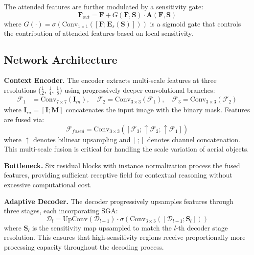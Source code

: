 \documentclass[preprint,12pt]{elsarticle}
\begin{document}
The attended features are further modulated by a sensitivity gate:
\begin{equation}
\mathbf{F}_{out} = \mathbf{F} + G(\mathbf{F}, \mathbf{S}) \cdot \mathbf{A}(\mathbf{F}, \mathbf{S})
\label{eq:gate}
\end{equation}
where $G(\cdot) = \sigma(\text{Conv}_{1\times1}([\mathbf{F}; \mathbf{E}_s(\mathbf{S})]))$ is a sigmoid gate that controls the contribution of attended features based on local sensitivity.

\subsection{Network Architecture}

\textbf{Context Encoder.} The encoder extracts multi-scale features at three resolutions ($\frac{1}{2}$, $\frac{1}{4}$, $\frac{1}{8}$) using progressively deeper convolutional branches:
\begin{align}
\mathcal{F}_1 &= \text{Conv}_{7\times7}(\mathbf{I}_{in}), \quad \mathcal{F}_2 = \text{Conv}_{3\times3}(\mathcal{F}_1), \quad \mathcal{F}_3 = \text{Conv}_{3\times3}(\mathcal{F}_2)
\end{align}
where $\mathbf{I}_{in} = [\mathbf{I}; \mathbf{M}]$ concatenates the input image with the binary mask. Features are fused via:
\begin{equation}
\mathcal{F}_{fused} = \text{Conv}_{3\times3}\left(\left[\mathcal{F}_3; \uparrow\mathcal{F}_2; \uparrow\mathcal{F}_1\right]\right)
\end{equation}
where $\uparrow$ denotes bilinear upsampling and $[;]$ denotes channel concatenation. This multi-scale fusion is critical for handling the scale variation of aerial objects.

\textbf{Bottleneck.} Six residual blocks with instance normalization process the fused features, providing sufficient receptive field for contextual reasoning without excessive computational cost.

\textbf{Adaptive Decoder.} The decoder progressively upsamples features through three stages, each incorporating SGA:
\begin{equation}
\mathcal{D}_l = \text{UpConv}(\mathcal{D}_{l-1}) \cdot \sigma\left(\text{Conv}_{3\times3}\left(\left[\mathcal{D}_{l-1}; \mathbf{S}_l\right]\right)\right)
\end{equation}
where $\mathbf{S}_l$ is the sensitivity map upsampled to match the $l$-th decoder stage resolution. This ensures that high-sensitivity regions receive proportionally more processing capacity throughout the decoding process.
\end{document}
